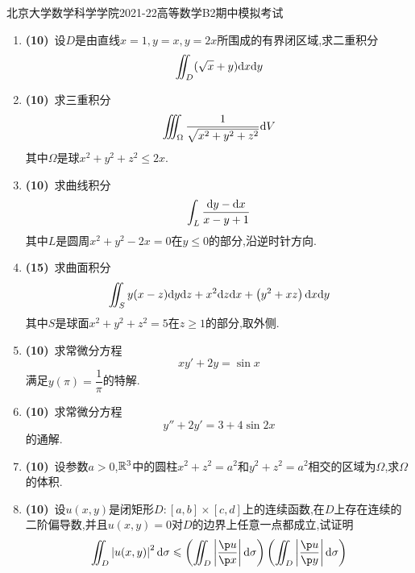 \documentclass{ctexart}
\begin{document}
\pagestyle{empty}
\begin{center}\Large
    北京大学数学科学学院2021-22高等数学B2期中模拟考试
\end{center}
\begin{enumerate}[leftmargin=*,label=\textbf{\arabic*.}]
    \item \textbf{(10)}\ 设$D$是由直线$x=1,y=x,y=2x$所围成的有界闭区域,求二重积分
    \[\iint_D(\sqrt x+y)\mathrm{d} x\mathrm{d} y\]

    \item \textbf{(10)}\ 求三重积分
    \[\iiint_\Omega\dfrac{1}{\sqrt{x^2+y^2+z^2}}\mathrm{d} V\]
    其中$\Omega$是球$x^2+y^2+z^2\leqslant 2x$.

    \item \textbf{(10)}\ 求曲线积分
    \[\int_L\dfrac{\mathrm{d} y-\mathrm{d} x}{x-y+1}\]
    其中$L$是圆周$x^2+y^2-2x=0$在$y\leqslant 0$的部分,沿逆时针方向.

    \item \textbf{(15)}\ 求曲面积分
    \[\iint_Sy(x-z)\mathrm{d} y\mathrm{d} z+x^2\mathrm{d} z\mathrm{d} x+\left(y^2+xz\right)\mathrm{d} x\mathrm{d} y\]
    其中$S$是球面$x^2+y^2+z^2=5$在$z\geqslant 1$的部分,取外侧.

    \item \textbf{(10)}\ 求常微分方程
    \[xy'+2y=\sin x\]
    满足$y(\pi)=\dfrac1\pi$的特解.

    \item \textbf{(10)}\ 求常微分方程
    \[y''+2y'=3+4\sin 2x\]
    的通解.

    \item \textbf{(10)}\ 设参数$a>0$,$\mathbb{R}^3$中的圆柱$x^2+z^2=a^2$和$y^2+z^2=a^2$相交的区域为$\Omega$,求$\Omega$的体积.

    \item \textbf{(10)}\ 设$u(x,y)$是闭矩形$D:[a,b]\times[c,d]$上的连续函数,在$D$上存在连续的二阶偏导数,并且$u(x,y)=0$对$D$的边界上任意一点都成立,试证明
    \[\iint_D\left|u(x,y)\right|^2\di\sigma\leqslant\left(\iint_D\left|\dfrac{\p u}{\p x}\right|\di\sigma\right)\left(\iint_D\left|\dfrac{\p u}{\p y}\right|\di\sigma\right)\]


\end{enumerate}
\end{document}
